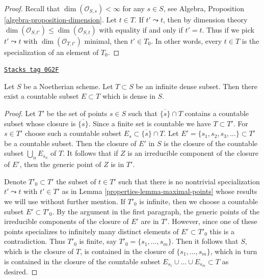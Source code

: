 \begin{proof}
Recall that $\dim(\mathcal{O}_{S, s}) < \infty$ for any $s \in S$, see
Algebra, Proposition \ref{algebra-proposition-dimension}. Let $t \in T$.
If $t' \leadsto t$, then by dimension theory
$\dim(\mathcal{O}_{S, t'}) \leq \dim(\mathcal{O}_{S, t})$
with equality if and only if $t' = t$. Thus if we pick $t' \leadsto t$
with $\dim(\mathcal{O}_{T, t'})$ minimal, then $t' \in T_0$.
In other words,
every $t \in T$ is the specialization of an element of $T_0$.
\end{proof}

\begin{lemma}
\label{properties-lemma-countable-dense-subset}
\href{https://stacks.math.columbia.edu/tag/0G2F}{\texttt{Stacks tag 0G2F}}

Let $S$ be a Noetherian scheme. Let $T \subset S$ be an infinite dense subset.
Then there exist a countable subset $E \subset T$ which is dense in $S$.
\end{lemma}

\begin{proof}

Let $T'$ be the set of points $s \in S$ such that $\overline{\{s\}} \cap T$
contains a countable subset whose closure is $\overline{\{s\}}$.
Since a finite set is countable we have $T \subset T'$.
For $s \in T'$ choose such a countable subset
$E_s \subset \overline{\{s\}} \cap T$.
Let $E' = \{s_1, s_2, s_3, \ldots\} \subset T'$
be a countable subset. Then the closure of $E'$ in $S$ is the
closure of the countable subset $\bigcup_n E_{s_n}$ of $T$.
It follows that if $Z$
is an irreducible component of the closure of $E'$, then the generic
point of $Z$ is in $T'$.

\medskip\noindent
Denote $T'_0 \subset T'$ the subset of $t \in T'$ such that
there is no nontrivial specialization $t' \leadsto t$ with $t' \in T'$
as in Lemma \ref{properties-lemma-maximal-points} whose results we will use
without further mention. If $T'_0$ is infinite, then we choose a
countable subset $E' \subset T'_0$. By the argument in the first
paragraph, the generic points of the irreducible components of the
closure of $E'$ are in $T'$. However, since one of these points specializes to
infinitely many distinct elements of $E' \subset T'_0$
this is a contradiction. Thus $T'_0$ is finite, say
$T'_0 = \{s_1, \ldots, s_m\}$. Then it follows that $S$, which is
the closure of $T$, is contained in the closure of
$\{s_1, \ldots, s_m\}$, which in turn is contained in the closure
of the countable subset $E_{s_1} \cup \ldots \cup E_{s_m} \subset T$
as desired.
\end{proof}


